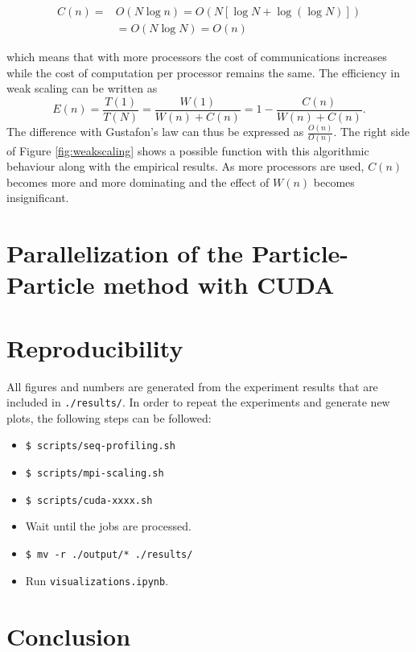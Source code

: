\documentclass[10pt,journal,compsocconf]{IEEEtran}
\newcommand{\code}[1]{\texttt{#1}}
\begin{document}
\begin{equation*}
  \begin{aligned}
    C(n) = & O(N \log n) = O(N [\log N + \log(\log N)]) \\
    & = O(N \log N) = O(n)
  \end{aligned}
\end{equation*}

which means that with more processors the cost of communications increases while the cost of computation per processor remains the same. The efficiency in weak scaling can be written as
\begin{equation*}
  E(n) = \frac{T(1)}{T(N)} = \frac{W(1)}{W(n) + C(n)} = 1 - \frac{C(n)}{W(n) + C(n)}.
\end{equation*}
The difference with Gustafon's law can thus be expressed as $\frac{O(n)}{O(n)}$. The right side of Figure \ref{fig:weakscaling} shows a possible function with this algorithmic behaviour along with the empirical results. As more processors are used, $C(n)$ becomes more and more dominating and the effect of $W(n)$ becomes insignificant.

\section{Parallelization of the Particle-Particle method with CUDA}


\section{Reproducibility}

All figures and numbers are generated from the experiment results that are included in \code{./results/}. In order to repeat the experiments and generate new plots, the following steps can be followed:
\begin{itemize}
    \item \code{\$ scripts/seq-profiling.sh}
    \item \code{\$ scripts/mpi-scaling.sh}
    \item \code{\$ scripts/cuda-xxxx.sh}
    \item Wait until the jobs are processed.
    \item \code{\$ mv -r ./output/* ./results/}
    \item Run \code{visualizations.ipynb}.
\end{itemize}

\section{Conclusion}
\end{document}
